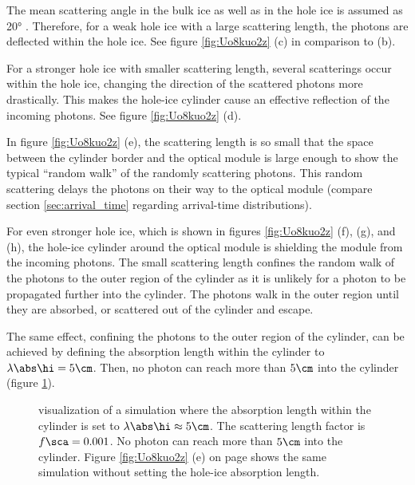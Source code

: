 The mean scattering angle in the bulk ice as well as in the hole ice is assumed as \ang{20} \cite{escawiki}. Therefore, for a weak hole ice with a large scattering length, the photons are deflected within the hole ice. See figure \ref{fig:Uo8kuo2z} (c) in comparison to (b).

For a stronger hole ice with smaller scattering length, several scatterings occur within the hole ice, changing the direction of the scattered photons more drastically. This makes the hole-ice cylinder cause an effective reflection of the incoming photons. See figure \ref{fig:Uo8kuo2z} (d).

In figure \ref{fig:Uo8kuo2z} (e), the scattering length is so small that the space between the cylinder border and the optical module is large enough to show the typical ``random walk'' \cite{randomwalk} of the randomly scattering photons. This random scattering delays the photons on their way to the optical module (compare section \ref{sec:arrival_time} regarding arrival-time distributions).

For even stronger hole ice, which is shown in figures \ref{fig:Uo8kuo2z} (f), (g), and (h), the hole-ice cylinder around the optical module is shielding the module from the incoming photons. The small scattering length confines the random walk of the photons to the outer region of the cylinder as it is unlikely for a photon to be propagated further into the cylinder. The photons walk in the outer region until they are absorbed, or scattered out of the cylinder and escape.

The same effect, confining the photons to the outer region of the cylinder, can be achieved by defining the absorption length within the cylinder to $\lambda\abs\hi = 5\cm$. Then, no photon can reach more than $5\cm$ into the cylinder (figure \ref{fig:Lie7laxa}).

\begin{figure}[htbp]
  \caption{\steamshovel visualization of a simulation where the absorption length within the cylinder is set to $\lambda\abs\hi \approx 5\cm$. The scattering length factor is $f\sca=0.001$. No photon can reach more than $5\cm$ into the cylinder. Figure \ref{fig:Uo8kuo2z} (e) on page \pageref{fig:Uo8kuo2z} shows the same simulation without setting the hole-ice absorption length.}
  \label{fig:Lie7laxa}
\end{figure}

